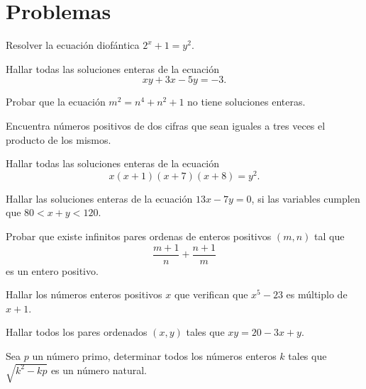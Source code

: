 \newpage
\section{Problemas}

\begin{exercise}
    Resolver la ecuación diofántica $2^x + 1 = y^2$.
\end{exercise}

\begin{exercise}
    Hallar todas las soluciones enteras de la ecuación
    \[
        xy + 3x - 5y = -3.
    \]
\end{exercise}

\begin{exercise}
    Probar que la ecuación $m^2 = n^4 + n^2 + 1$ no tiene soluciones enteras.
\end{exercise}

\begin{exercise}
    Encuentra números positivos de dos cifras que sean iguales a tres veces el producto de los mismos.
\end{exercise}

\begin{exercise}
    Hallar todas las soluciones enteras de la ecuación
    \[
        x(x + 1)(x + 7)(x + 8) = y^2.
    \]
\end{exercise}

\begin{exercise}
    Hallar las soluciones enteras de la ecuación $13x - 7y = 0$, si las variables cumplen que $80 < x + y < 120$.
\end{exercise}

\begin{exercise}
    Probar que existe infinitos pares ordenas de enteros positivos $(m,n)$ tal que
    \[
        \frac{m + 1}{n} + \frac{n + 1}{m}
    \]
    es un entero positivo.
\end{exercise}

\begin{exercise}
    Hallar los números enteros positivos $x$ que verifican que $x^5 - 23$ es múltiplo de $x + 1$.
\end{exercise}

\begin{exercise}
    Hallar todos los pares ordenados $(x,y)$ tales que $xy = 20 - 3x + y$.
\end{exercise}

\begin{problem}
    Sea $p$ un número primo, determinar todos los números enteros $k$ tales que $\sqrt {k^2 - kp}$ es un número natural.
\end{problem}